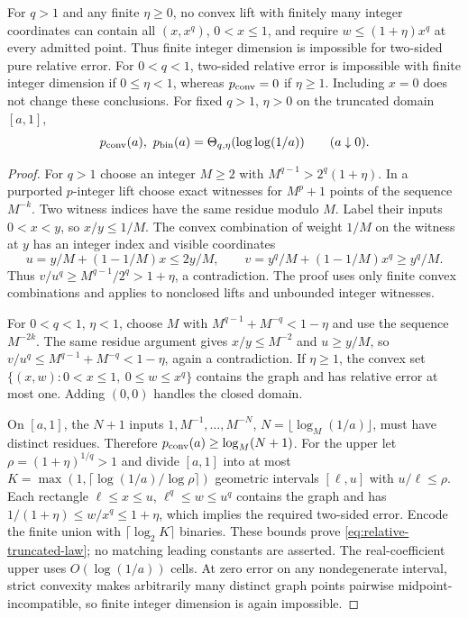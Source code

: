 \begin{proposition}\label{prop:relative-power}
For $q>1$ and any finite $\eta\ge0$, no convex lift with finitely
many integer coordinates can contain all $(x,x^q)$, $0<x\le1$,
and require $w\le(1+\eta)x^q$ at every admitted point. Thus finite
integer dimension is impossible for two-sided pure relative error.
For $0<q<1$, two-sided relative error is impossible with finite integer
dimension if $0\le\eta<1$, whereas $p_{\mathrm{conv}}=0$ if $\eta\ge1$.
Including $x=0$ does not change these conclusions.
For fixed $q>1$, $\eta>0$ on the truncated domain $[a,1]$,
\begin{equation}\label{eq:relative-truncated-law}
 p_{\mathrm{conv}}(a),\ p_{\mathrm{bin}}(a)=\Theta_{q,\eta}(\log\log(1/a))
 \qquad(a\downarrow0).
\end{equation}
\end{proposition}
\begin{proof}
For $q>1$ choose an integer $M\ge2$ with
$M^{q-1}>2^q(1+\eta)$. In a purported $p$-integer lift choose
exact witnesses for $M^p+1$ points of the sequence $M^{-k}$.
Two witness indices have the same residue modulo $M$. Label their
inputs $0<x<y$, so $x/y\le1/M$. The convex combination of weight
$1/M$ on the witness at $y$ has an integer index and visible coordinates
\[
 u=y/M+(1-1/M)x\le2y/M,\qquad
 v=y^q/M+(1-1/M)x^q\ge y^q/M.
\]
Thus $v/u^q\ge M^{q-1}/2^q>1+\eta$, a contradiction. The proof
uses only finite convex combinations and applies to nonclosed lifts
and unbounded integer witnesses.

For $0<q<1$, $\eta<1$, choose $M$ with
$M^{q-1}+M^{-q}<1-\eta$ and use the sequence $M^{-2k}$.
The same residue argument gives $x/y\le M^{-2}$ and $u\ge y/M$,
so $v/u^q\le M^{q-1}+M^{-q}<1-\eta$, again a contradiction.
If $\eta\ge1$, the convex set
$\{(x,w):0<x\le1,\ 0\le w\le x^q\}$ contains the graph and
has relative error at most one. Adding $(0,0)$ handles the closed domain.

On $[a,1]$, the $N+1$ inputs $1,M^{-1},\ldots,M^{-N}$,
$N=\lfloor\log_M(1/a)\rfloor$, must have distinct residues.
Therefore $p_{\mathrm{conv}}(a)\ge\log_M(N+1)$. For the upper let
$\rho=(1+\eta)^{1/q}>1$ and divide $[a,1]$ into at most
$K=\max(1,\lceil\log(1/a)/\log\rho\rceil)$ geometric intervals
$[\ell,u]$ with $u/\ell\le\rho$. Each rectangle
$\ell\le x\le u$, $\ell^q\le w\le u^q$ contains the graph
and has $1/(1+\eta)\le w/x^q\le1+\eta$, which implies the
required two-sided error. Encode the finite union with
$\lceil\log_2K\rceil$ binaries. These bounds prove
\eqref{eq:relative-truncated-law}; no matching leading constants
are asserted. The real-coefficient upper uses $O(\log(1/a))$ cells.
At zero error on any nondegenerate interval, strict convexity makes
arbitrarily many distinct graph points pairwise midpoint-incompatible,
so finite integer dimension is again impossible.
\end{proof}


